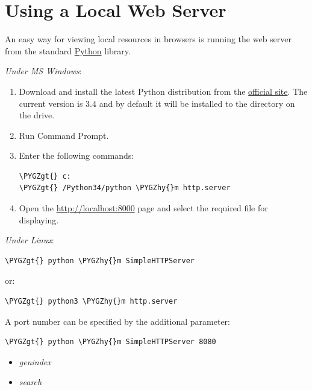 \documentclass[a4paper,12pt,oneside]{sphinxmanual}
\def\PYGZgt{\char`\>}
\def\PYGZhy{\char`\-}
\begin{document}
\section{Using a Local Web Server}
\label{problems_and_solutions:local-web-server}\label{problems_and_solutions:web}
An easy way for viewing local resources in browsers is running the web server from the standard \href{http://en.wikipedia.org/wiki/Python\_(programming\_language)}{Python} library.

\emph{Under MS Windows}:
\begin{enumerate}
\item {} 
Download and install the latest Python distribution from the \href{http://www.python.org/download/releases/}{official site}. The current version is 3.4 and by default it will be installed to the  directory on the  drive.

\item {} 
Run Command Prompt.

\item {} 
Enter the following commands:

\begin{Verbatim}[commandchars=\\\{\}]
\PYGZgt{} c:
\PYGZgt{} /Python34/python \PYGZhy{}m http.server
\end{Verbatim}

\item {} 
Open the \href{http://localhost:8000}{http://localhost:8000} page and select the required file for displaying.

\end{enumerate}

\emph{Under Linux}:

\begin{Verbatim}[commandchars=\\\{\}]
\PYGZgt{} python \PYGZhy{}m SimpleHTTPServer
\end{Verbatim}

or:

\begin{Verbatim}[commandchars=\\\{\}]
\PYGZgt{} python3 \PYGZhy{}m http.server
\end{Verbatim}

A port number can be specified by the additional parameter:

\begin{Verbatim}[commandchars=\\\{\}]
\PYGZgt{} python \PYGZhy{}m SimpleHTTPServer 8080
\end{Verbatim}
\begin{itemize}
\item {} 
\emph{genindex}

\item {} 
\emph{search}

\end{itemize}



\renewcommand{\indexname}{Index}
\printindex
\end{document}
